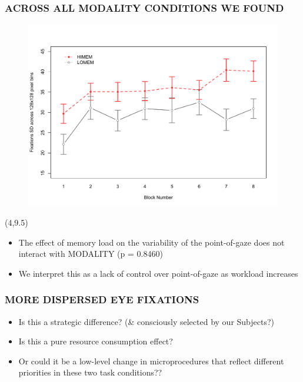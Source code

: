 \documentclass{beamer}
\begin{document}
\begin{frame} %
	\frametitle{ACROSS ALL MODALITY CONDITIONS WE FOUND}
	\vspace{-1cm}
	\begin{figure}
		\centering
  		\includegraphics[scale=.5]{../zNvBkFigs/Rplot-wkld_by_blk-g128-noHdr}
	\end{figure}
	\begin{textblock}{10}(4,9.5)
		{\tiny{\begin{itemize}
			\item The effect of memory load on the variability of the point-of-gaze does \alert{not} interact with MODALITY (p = 0.8460)
			\item We interpret this as a lack of control over point-of-gaze as workload increases
		\end{itemize}}}
    	\end{textblock} 


\end{frame}



\begin{frame} 
	\frametitle{MORE DISPERSED EYE FIXATIONS}
	\begin{itemize}
		\item Is this a strategic difference? (\& consciously selected by our Subjects?)
		\pause
		\item Is this a pure resource consumption effect?
		\pause
		\item Or could it be a low-level change in microprocedures that reflect different priorities in these two task conditions??
 	\end{itemize}
\end{frame}
\end{document}
